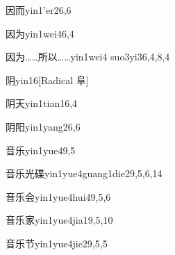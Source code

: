 \begin{verbete}{因而}{yin1'er2}{6,6}
\end{verbete}

\begin{verbete}{因为}{yin1wei4}{6,4}
\end{verbete}

\begin{verbete}{因为……所以……}{yin1wei4 suo3yi3}{6,4,8,4}
\end{verbete}

\begin{verbete}{阴}{yin1}{6}[Radical 阜]
\end{verbete}

\begin{verbete}{阴天}{yin1tian1}{6,4}
\end{verbete}

\begin{verbete}{阴阳}{yin1yang2}{6,6}
\end{verbete}

\begin{verbete}{音乐}{yin1yue4}{9,5}
\end{verbete}

\begin{verbete}{音乐光碟}{yin1yue4guang1die2}{9,5,6,14}
\end{verbete}

\begin{verbete}{音乐会}{yin1yue4hui4}{9,5,6}
\end{verbete}

\begin{verbete}{音乐家}{yin1yue4jia1}{9,5,10}
\end{verbete}

\begin{verbete}{音乐节}{yin1yue4jie2}{9,5,5}
\end{verbete}

